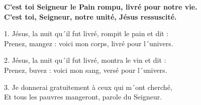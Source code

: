\textbf{
C'est toi Seigneur le Pain rompu, livré pour notre vie.\\
C'est toi, Seigneur, notre unité,
Jésus ressuscité.
}

1.
Jésus, la nuit qu´il fut livré, rompit le pain et dit :\\
Prenez, mangez : voici mon corps, livré pour l´univers.

2.
Jésus, la nuit qu´il fut livré, montra le vin et dit :\\
Prenez, buvez : voici mon sang, versé pour l´univers.

3.
Je donnerai gratuitement à ceux qui m´ont cherché,\\
Et tous les pauvres mangeront, parole du Seigneur.
